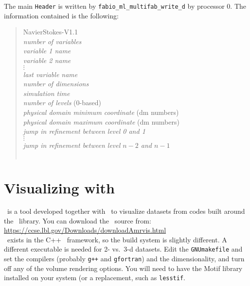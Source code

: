 The main {\tt Header} is written by {\tt fabio\_ml\_multifab\_write\_d} by
processor 0.  The information contained is the following:
\begin{quote}
NavierStokes-V1.1 \\
{\em number of variables} \\
{\em variable 1 name} \\
{\em variable 2 name} \\
$\vdots$ \\
{\em last variable name} \\
{\em number of dimensions} \\
{\em simulation time} \\
{\em number of levels} (0-based) \\
{\em physical domain minimum coordinate} (dm numbers) \\
{\em physical domain maximum coordinate} (dm numbers) \\
{\em jump in refinement between level 0 and 1} \\
$\vdots$ \\
{\em jump in refinement between level $n-2$ and $n-1$} \\
~\\

\end{quote}




\section{Visualizing with \amrvis}

\amrvis\ is a tool developed together with \boxlib\ to visualize datasets
from codes built around the \boxlib\ library.  You can download the
\amrvis\ source from: \\
\url{https://ccse.lbl.gov/Downloads/downloadAmrvis.html} \\

\amrvis\ exists in the C++ \boxlib\ framework, so the build system is
slightly different.  A different executable is needed for 2- vs.\ 3-d
datasets.  Edit the {\tt GNUmakefile} and set the compilers (probably
{\tt g++} and {\tt gfortran}) and the dimensionality, and turn off any
of the volume rendering options.  You will need to have the Motif library
installed on your system (or a replacement, such as {\tt lesstif}.  

